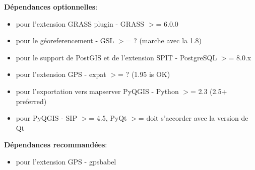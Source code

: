 %
%
%

\textbf{Dépendances optionnelles}:

\begin{itemize}
\item pour l'extension GRASS plugin - GRASS $>$= 6.0.0
\item pour le géoreferencement - GSL $>$= ? (marche avec la 1.8)
\item pour le support de PostGIS et de l'extension SPIT - PostgreSQL $>$= 8.0.x
\item pour l'extension GPS - expat $>$= ? (1.95 is OK)
\item pour l'exportation vers mapserver PyQGIS - Python $>$= 2.3 (2.5+
preferred)
\item pour PyQGIS - SIP $>$= 4.5, PyQt $>$= doit s'accorder avec la version de
Qt
\end{itemize}

\textbf{Dépendances recommandées}:

\begin{itemize}
\item pour l'extension GPS - gpsbabel
\end{itemize}

